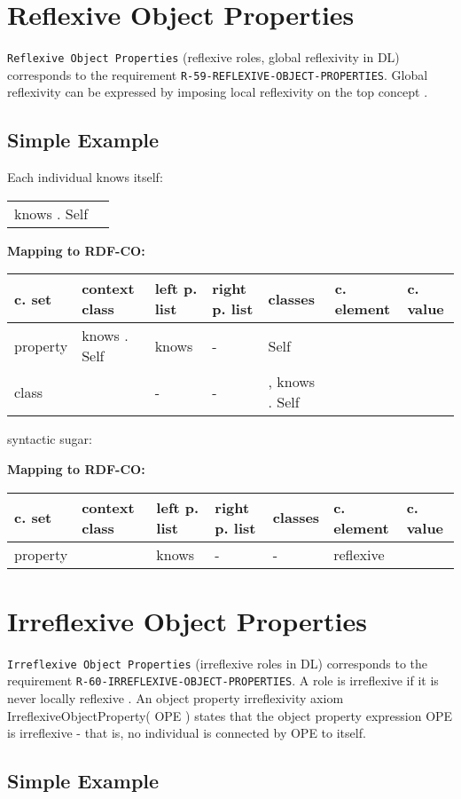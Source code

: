 \documentclass{llncs}
\newcommand{\ms}[1]{\texttt{#1}}
\newenvironment{gcotable}{
  \scriptsize
  \sffamily
  \vspace{0cm}
	\begin{center}
	\textbf{\vspace{0.4cm}Mapping to RDF-CO:} \\
  \begin{tabular}{l|l|l|l|l|l|l}
	\hline
  \textbf{c. set} & \textbf{context class} & \textbf{left p. list} & \textbf{right p. list} & \textbf{classes} & \textbf{c. element} & \textbf{c. value} \\
  \hline

}{
  \hline
  \end{tabular}
	\end{center}
}
\newenvironment{DL}{
\vspace{0cm}
	\begin{center}
  \begin{tabular}{r l}

}{
  \end{tabular}
	\end{center}
}
\begin{document}
\section{Reflexive Object Properties}

\ms{Reflexive Object Properties} (reflexive roles, global reflexivity in DL) corresponds to the requirement \ms{R-59-REFLEXIVE-OBJECT-PROPERTIES}.
Global reflexivity can be expressed by imposing local reflexivity on the top concept \cite{Kroetzsch2012}.

\subsection{Simple Example}

Each individual knows itself:

\begin{DL}
   knows . Self
\end{DL}

\begin{gcotable}
property &  knows . Self & knows & - & Self &  \\
class &  & - & - & ,  knows . Self &  \\
\end{gcotable}

syntactic sugar:

\begin{gcotable}
property &  & knows & - & - & reflexive \\
\end{gcotable}

\section{Irreflexive Object Properties}

\ms{Irreflexive Object Properties} (irreflexive roles in DL) corresponds to the requirement \ms{R-60-IRREFLEXIVE-OBJECT-PROPERTIES}.
A role is irreflexive if it is never locally reflexive \cite{Kroetzsch2012}.
An object property irreflexivity axiom IrreflexiveObjectProperty( OPE ) states that the object property expression OPE is irreflexive - that is, no individual is connected by OPE to itself. 

\subsection{Simple Example}

\begin{DL}
    
\end{DL}
\end{document}
